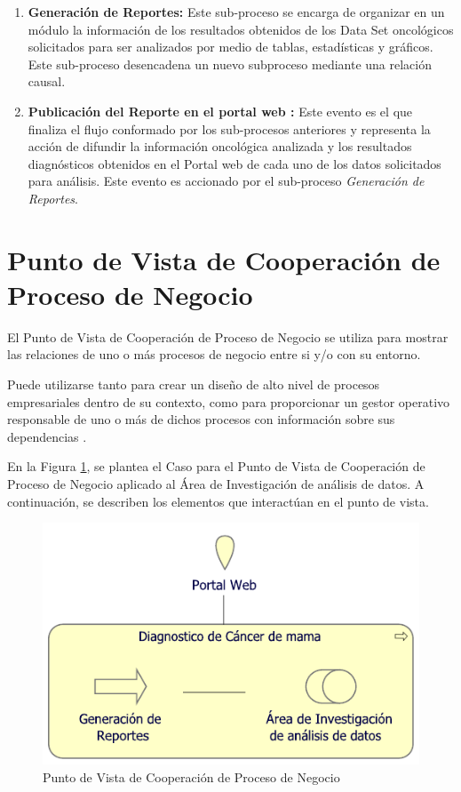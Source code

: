 \begin{enumerate}[label=\textbf{\arabic*})]
	\item  \textbf{Generación  de Reportes:} Este sub-proceso se encarga de organizar en un módulo la información de los resultados obtenidos de los Data Set oncológicos solicitados para ser analizados por medio de tablas, estadísticas y gráficos. Este sub-proceso desencadena un nuevo subproceso mediante una relación causal.
	\newpage
	\item  \textbf{Publicación del Reporte en el portal web :} Este evento es el que finaliza el flujo conformado por los sub-procesos anteriores y representa la acción de difundir la información oncológica analizada y  los resultados diagnósticos obtenidos en el Portal web  de cada uno de los datos solicitados para análisis. Este evento es accionado por el sub-proceso \textit{Generación  de Reportes}.
\end{enumerate}

\newpage
\section{Punto de Vista de Cooperación de Proceso de Negocio}
El Punto de Vista de Cooperación de Proceso de Negocio se utiliza para mostrar las relaciones de uno o más procesos de negocio entre si y/o con su entorno\cite{BolanosCastro2019}.

Puede utilizarse tanto para crear un diseño de alto nivel de procesos empresariales dentro de su contexto, como para proporcionar un gestor operativo responsable de uno o más de dichos procesos con información sobre sus dependencias \cite{BolanosCastro2019}.

En la Figura \ref{PvCooperacionProces}, se plantea el Caso para el Punto de Vista de Cooperación de Proceso de Negocio aplicado al Área de Investigación de análisis de datos. A continuación, se describen los elementos que interactúan en el punto de vista.

\begin{figure}[h!]
	\centering
	\includegraphics[width=0.75\linewidth]{ARQUITECTURA/imgs/CapaNegocio/5_PvCooperacionProceso}
	\caption{Punto de Vista de Cooperación de Proceso de Negocio}
	\label{PvCooperacionProces}
\end{figure}

